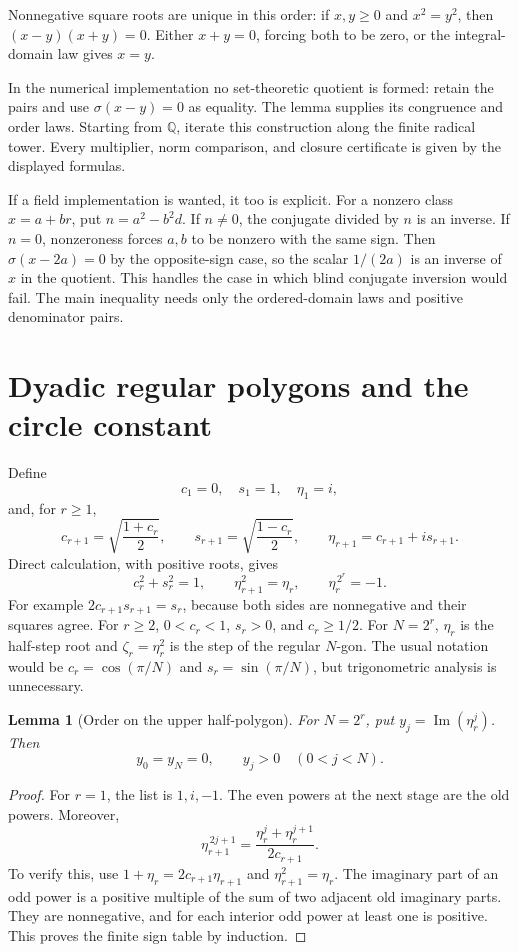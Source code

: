 \documentclass[11pt,a4paper]{article}
\newtheorem{lemma}[theorem]{Lemma}
\theoremstyle{definition}
\newcommand{\Q}{\mathbb Q}
\newcommand{\Ima}{\operatorname{Im}}
\begin{document}
Nonnegative square roots are unique in this order: if \(x,y\ge0\)
and \(x^2=y^2\), then \((x-y)(x+y)=0\). Either \(x+y=0\), forcing
both to be zero, or the integral-domain law gives \(x=y\).

In the numerical implementation no set-theoretic quotient is formed:
retain the pairs and use \(\sigma(x-y)=0\) as equality.
The lemma supplies its congruence and order laws.
Starting from \(\Q\), iterate this construction along the finite
radical tower. Every multiplier, norm comparison, and closure
certificate is given by the displayed formulas.

If a field implementation is wanted, it too is explicit. For a
nonzero class \(x=a+br\), put \(n=a^2-b^2d\). If \(n\ne0\),
the conjugate divided by \(n\) is an inverse. If \(n=0\),
nonzeroness forces \(a,b\) to be nonzero with the same sign.
Then \(\sigma(x-2a)=0\) by the opposite-sign case, so the scalar
\(1/(2a)\) is an inverse of \(x\) in the quotient. This handles the
case in which blind conjugate inversion would fail. The main
inequality needs only the ordered-domain laws and positive
denominator pairs.

\section{Dyadic regular polygons and the circle constant}\label{sec:roots}
Define
\[
 c_1=0,\quad s_1=1,\quad \eta_1=i,
\]
and, for \(r\ge1\),
\[
 c_{r+1}=\sqrt{\frac{1+c_r}{2}},\qquad
 s_{r+1}=\sqrt{\frac{1-c_r}{2}},\qquad
 \eta_{r+1}=c_{r+1}+is_{r+1}.
 \tag{3.1}\label{eq:halfangle}
\]
Direct calculation, with positive roots, gives
\[
 c_r^2+s_r^2=1,\qquad
 \eta_{r+1}^2=\eta_r,\qquad
 \eta_r^{\,2^r}=-1.
 \tag{3.2}\label{eq:rootfacts}
\]
For example \(2c_{r+1}s_{r+1}=s_r\), because both sides are
nonnegative and their squares agree. For \(r\ge2\),
\(0<c_r<1\), \(s_r>0\), and \(c_r\ge1/2\).
For \(N=2^r\), \(\eta_r\) is the half-step root and
\(\zeta_r=\eta_r^2\) is the step of the regular \(N\)-gon.
The usual notation would be \(c_r=\cos(\pi/N)\) and
\(s_r=\sin(\pi/N)\), but trigonometric analysis is unnecessary.

\begin{lemma}[Order on the upper half-polygon]\label{lem:semicircle}
For \(N=2^r\), put \(y_j=\Ima(\eta_r^j)\). Then
\[
 y_0=y_N=0,\qquad y_j>0\quad(0<j<N).
 \tag{3.3}\label{eq:upper}
\]
\end{lemma}
\begin{proof}
For \(r=1\), the list is \(1,i,-1\).
The even powers at the next stage are the old powers. Moreover,
\[
 \eta_{r+1}^{\,2j+1}
   =\frac{\eta_r^j+\eta_r^{j+1}}{2c_{r+1}}.
 \tag{3.4}\label{eq:midpoints}
\]
To verify this, use
\(1+\eta_r=2c_{r+1}\eta_{r+1}\) and
\(\eta_{r+1}^2=\eta_r\). The imaginary part of an odd power
is a positive multiple of the sum of two adjacent old imaginary
parts. They are nonnegative, and for each interior odd power at least
one is positive. This proves the finite sign table by induction.
\end{proof}
\end{document}
